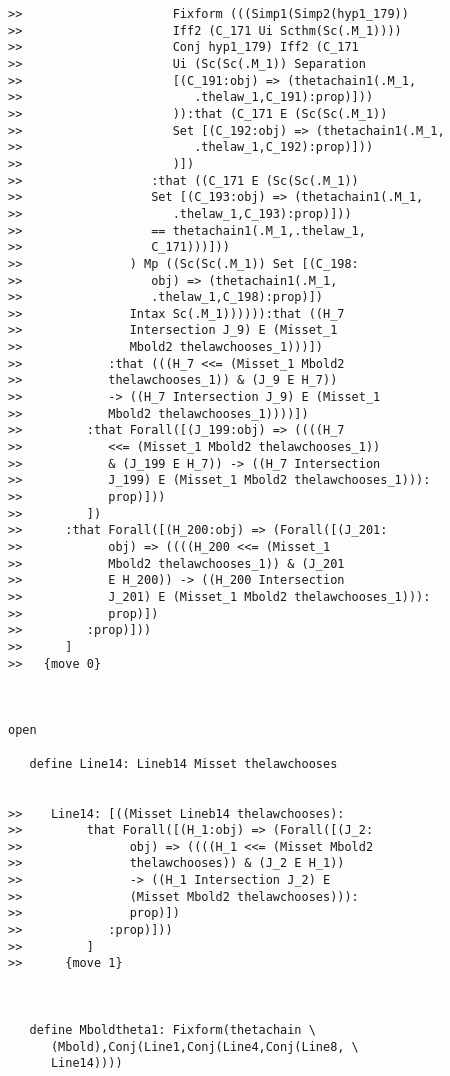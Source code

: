 \documentclass[12pt]{article}
\begin{document}
\begin{verbatim}
>>                     Fixform (((Simp1(Simp2(hyp1_179))
>>                     Iff2 (C_171 Ui Scthm(Sc(.M_1))))
>>                     Conj hyp1_179) Iff2 (C_171
>>                     Ui (Sc(Sc(.M_1)) Separation
>>                     [(C_191:obj) => (thetachain1(.M_1,
>>                        .thelaw_1,C_191):prop)]))
>>                     )):that (C_171 E (Sc(Sc(.M_1))
>>                     Set [(C_192:obj) => (thetachain1(.M_1,
>>                        .thelaw_1,C_192):prop)]))
>>                     )])
>>                  :that ((C_171 E (Sc(Sc(.M_1))
>>                  Set [(C_193:obj) => (thetachain1(.M_1,
>>                     .thelaw_1,C_193):prop)]))
>>                  == thetachain1(.M_1,.thelaw_1,
>>                  C_171)))]))
>>               ) Mp ((Sc(Sc(.M_1)) Set [(C_198:
>>                  obj) => (thetachain1(.M_1,
>>                  .thelaw_1,C_198):prop)])
>>               Intax Sc(.M_1)))))):that ((H_7
>>               Intersection J_9) E (Misset_1
>>               Mbold2 thelawchooses_1)))])
>>            :that (((H_7 <<= (Misset_1 Mbold2
>>            thelawchooses_1)) & (J_9 E H_7))
>>            -> ((H_7 Intersection J_9) E (Misset_1
>>            Mbold2 thelawchooses_1))))])
>>         :that Forall([(J_199:obj) => ((((H_7
>>            <<= (Misset_1 Mbold2 thelawchooses_1))
>>            & (J_199 E H_7)) -> ((H_7 Intersection
>>            J_199) E (Misset_1 Mbold2 thelawchooses_1))):
>>            prop)]))
>>         ])
>>      :that Forall([(H_200:obj) => (Forall([(J_201:
>>            obj) => ((((H_200 <<= (Misset_1
>>            Mbold2 thelawchooses_1)) & (J_201
>>            E H_200)) -> ((H_200 Intersection
>>            J_201) E (Misset_1 Mbold2 thelawchooses_1))):
>>            prop)])
>>         :prop)]))
>>      ]
>>   {move 0}



open

   define Line14: Lineb14 Misset thelawchooses


>>    Line14: [((Misset Lineb14 thelawchooses):
>>         that Forall([(H_1:obj) => (Forall([(J_2:
>>               obj) => ((((H_1 <<= (Misset Mbold2
>>               thelawchooses)) & (J_2 E H_1))
>>               -> ((H_1 Intersection J_2) E
>>               (Misset Mbold2 thelawchooses))):
>>               prop)])
>>            :prop)]))
>>         ]
>>      {move 1}



   define Mboldtheta1: Fixform(thetachain \
      (Mbold),Conj(Line1,Conj(Line4,Conj(Line8, \
      Line14))))


\end{verbatim}
\end{document}
